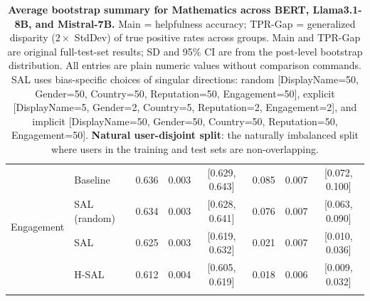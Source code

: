 \begin{table}[th!]
{\begin{tabular}{ll c c c c c c}
\multirow{4}{*}{Engagement} & Baseline & 0.636 & 0.003 & [0.629, 0.643] & 0.085 & 0.007 & [0.072, 0.100] \\
\addlinespace[4pt]
& SAL (random) & 0.634 & 0.003 & [0.628, 0.641] & 0.076 & 0.007 & [0.063, 0.090] \\
\addlinespace[4pt]
& SAL & 0.625 & 0.003 & [0.619, 0.632] & 0.021 & 0.007 & [0.010, 0.036] \\
\addlinespace[4pt]
& H-SAL & 0.612 & 0.004 & [0.605, 0.619] & 0.018 & 0.006 & [0.009, 0.032] \\
\addlinespace[4pt]
\bottomrule
\end{tabular}
}
\caption{\textbf{Average bootstrap summary for Mathematics across BERT, Llama3.1-8B, and Mistral-7B.}
Main = helpfulness accuracy; TPR-Gap = generalized disparity ($2 \times$ StdDev) of true positive rates across groups.
Main and TPR-Gap are original full-test-set results; SD and 95\% CI are from the post-level bootstrap distribution.
All entries are plain numeric values without comparison commands.
SAL uses bias-specific choices of singular directions: random [DisplayName=50, Gender=50, Country=50, Reputation=50, Engagement=50], explicit [DisplayName=5, Gender=2, Country=5, Reputation=2, Engagement=2], and implicit [DisplayName=50, Gender=50, Country=50, Reputation=50, Engagement=50].
\textbf{Natural user-disjoint split}: the naturally imbalanced split where users in the training and test sets are non-overlapping.}
\label{tab:ste-bootstrap-summary-plain-mathematics-natural-disjoint}
\end{table}
